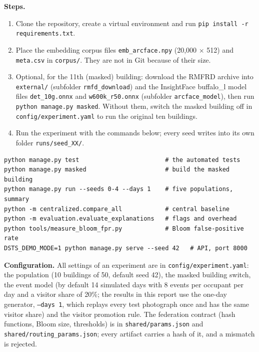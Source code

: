 \documentclass[12pt,a4paper,oneside]{report}
\begin{document}
\textbf{Steps.}
\begin{enumerate}
\item Clone the repository, create a virtual environment and run \texttt{pip install -r requirements.txt}.
\item Place the embedding corpus files \texttt{emb\_\allowbreak arcface.npy} (20,000 $\times$ 512) and \texttt{meta.csv} in \texttt{corpus/}. They are not in Git because of their size.
\item Optional, for the 11th (masked) building: download the RMFRD archive \cite{ref20} into \texttt{external/} (subfolder \texttt{rmfd\_\allowbreak \allowbreak download}) and the InsightFace buffalo\_\allowbreak \allowbreak l model files \texttt{det\_\allowbreak \allowbreak 10g.onnx} and \texttt{w600k\_\allowbreak \allowbreak r50.onnx} (subfolder \texttt{arcface\_\allowbreak \allowbreak model}), then run \texttt{python manage.py masked}. Without them, switch the masked building off in \texttt{config/experiment.yaml} to run the original ten buildings.
\item Run the experiment with the commands below; every seed writes into its own folder \texttt{runs/seed\_\allowbreak XX/}.
\end{enumerate}
\begin{footnotesize}
\begin{verbatim}
python manage.py test                        # the automated tests
python manage.py masked                      # build the masked building
python manage.py run --seeds 0-4 --days 1    # five populations, summary
python -m centralized.compare_all            # central baseline
python -m evaluation.evaluate_explanations   # flags and overhead
python tools/measure_bloom_fpr.py            # Bloom false-positive rate
DSTS_DEMO_MODE=1 python manage.py serve --seed 42   # API, port 8000
\end{verbatim}
\end{footnotesize}



\textbf{Configuration.} All settings of an experiment are in \texttt{config/experiment.yaml}: the population (10 buildings of 50, default seed 42), the masked building switch, the event model (by default 14 simulated days with 8 events per occupant per day and a visitor share of 20\%; the results in this report use the one-day generator, \texttt{--days 1}, which replays every test photograph once and has the same visitor share) and the visitor promotion rule. The federation contract (hash functions, Bloom size, thresholds) is in \texttt{shared/params.json} and \texttt{shared/routing\_\allowbreak params.json}; every artifact carries a hash of it, and a mismatch is rejected.
\end{document}

